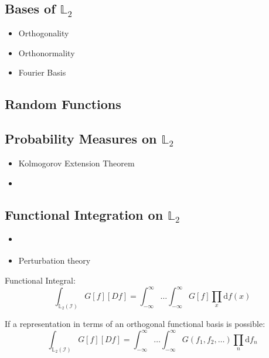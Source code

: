 \documentclass[11pt,twoside,a4paper]{article}
\theoremstyle{assumpstyle} \newtheorem{assumption}{Assumption}
\theoremstyle{assumpstyle} \newtheorem{definition}{Definition}
\begin{document}
		\subsection{Bases of $\mathbb{L}_2$}
			\begin{itemize}
				\item Orthogonality
				\item Orthonormality
				\item Fourier Basis
			\end{itemize}
	
		\subsection{Random Functions}
		
		\subsection{Probability Measures on $\mathbb{L}_2$}
			\begin{itemize}
				\item Kolmogorov Extension Theorem
				\item \cite{gihman_theory_2004}
			\end{itemize}
		
		\subsection{Functional Integration on $\mathbb{L}_2$}
			\begin{itemize}
				\item \cite{skorohod_integration_1974}
				\item Perturbation theory
			\end{itemize}
		
			Functional Integral:
			\begin{equation}
				\int_{\mathbb{L}_2(\mathcal{I})} G\left[f\right] \left[Df\right] = \int_{-\infty}^{\infty}\dots\int_{-\infty}^{\infty} G\left[f\right] \prod_{x} \mathrm{d}f(x)
			\end{equation}
		
			If a representation in terms of an orthogonal functional basis is possible:
			\begin{equation}
				\int_{\mathbb{L}_2(\mathcal{I})} G\left[f\right] \left[Df\right] = \int_{-\infty}^{\infty}\dots\int_{-\infty}^{\infty} G\left(f_1, f_2, \dots\right) \prod_{n} \mathrm{d}f_n
			\end{equation}
		
\end{document}
